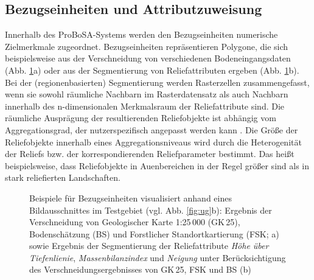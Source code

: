 \subsection{Bezugseinheiten und Attributzuweisung}\label{sec:be}
Innerhalb des ProBoSA-Systems werden den Bezugseinheiten numerische Zielmerkmale zugeordnet. Bezugseinheiten repräsentieren Polygone, die sich beispielsweise aus der Verschneidung von verschiedenen Bodeneingangsdaten (Abb. \ref{fig:be}a) oder aus der Segmentierung von Reliefattributen ergeben (Abb. \ref{fig:be}b). Bei der (regionenbasierten) Segmentierung werden Rasterzellen zusammengefasst, wenn sie sowohl räumliche Nachbarn im Rasterdatensatz als auch Nachbarn innerhalb des n-dimensionalen Merkmalsraum der Reliefattribute sind. Die räumliche Ausprägung der resultierenden Reliefobjekte ist abhängig vom Aggregationsgrad, der nutzerspezifisch angepasst werden kann \citep{Moeller-etal2008jpnss,Moeller-etal2012catena,MoellerVolk2015geoderma}. 
Die Größe der Reliefobjekte innerhalb eines Aggregationsniveaus wird durch die Heterogenität der Reliefs bzw. der korrespondierenden Reliefparameter bestimmt. Das heißt beispielsweise, dass Reliefobjekte in Auenbereichen in der Regel größer sind als in stark reliefierten Landschaften.



\begin{figure}[t]

\centering{}
\centering{}

\caption[Beispiele für Bezugseinheiten visualisiert anhand eines Bildausschnittes im Testgebiet \textit{Bode}.]{Beispiele für Bezugseinheiten visualisiert anhand eines Bildausschnittes im Testgebiet (vgl. Abb. \ref{fig:ug}b): Ergebnis der Verschneidung von Geologischer Karte 1:25\,000 (GK\,25), Bodenschätzung (BS) und Forstlicher Standortkartierung (FSK; a) sowie Ergebnis der Segmentierung der Reliefattribute \textit{Höhe über Tiefenlienie}, \textit{Massenbilanzindex} und \textit{Neigung} unter Berücksichtigung des Verschneidungsergebnisses von GK\,25, FSK und BS (b)}\label{fig:be}
\end{figure}


